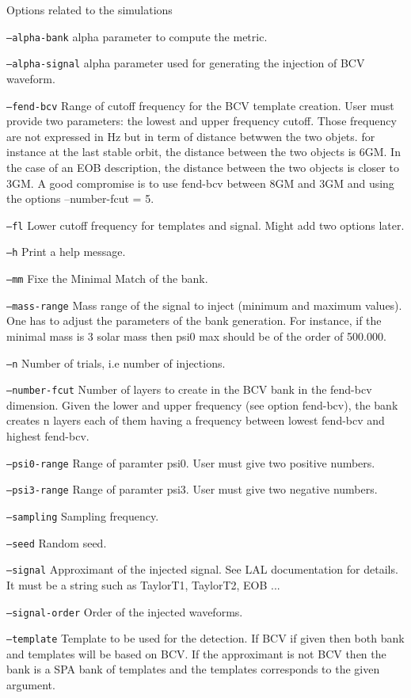 \begin{entry}
\item[Options related to the simulations]\leavevmode
\begin{entry}
\item[\texttt{--alpha-bank}]
alpha parameter to compute the metric.
\item[\texttt{--alpha-signal}]
alpha parameter used for generating the  injection of BCV waveform.
\item[\texttt{--fend-bcv}]
Range of cutoff frequency for the BCV template creation. User must provide two parameters: 
the lowest and upper frequency cutoff. Those frequency are not expressed in Hz but in term
of distance betwwen the two objets. for instance at the last stable orbit, the distance 
between the two objects is 6GM. In the case of an EOB description, the distance between 
the two objects is closer to 3GM. A good compromise is to use fend-bcv between 8GM and 3GM
and using the options --number-fcut = 5. 
\item[\texttt{--fl}]
Lower cutoff frequency for templates and signal. Might add two options later. 
\item[\texttt{--h}]
Print a help message.
\item[\texttt{--mm}]
Fixe the Minimal Match of the bank.
\item[\texttt{--mass-range}]
Mass range of the signal to inject (minimum and maximum values). One has to adjust
 the parameters of the bank generation. For instance, if the minimal mass is 3 solar
mass then psi0 max should be of the order of 500.000.
\item[\texttt{--n}]
Number of trials, i.e number of injections.
\item[\texttt{--number-fcut}]
Number of layers to create in the BCV bank in the fend-bcv dimension. 
Given the lower and upper frequency (see option fend-bcv), the bank creates
n layers each of them having a frequency between lowest fend-bcv and highest fend-bcv.
\item[\texttt{--psi0-range}]
Range of paramter psi0. User must give two positive numbers.
\item[\texttt{--psi3-range}]
Range of paramter psi3. User must give two negative numbers.
\item[\texttt{--sampling}]
Sampling frequency.
\item[\texttt{--seed}]
Random seed.
\item[\texttt{--signal}]
Approximant of the injected signal. See LAL documentation for details. It must be a string
such as TaylorT1, TaylorT2, EOB ...
\item[\texttt{--signal-order}]
Order of the injected waveforms.
\item[\texttt{--template}]
Template to be used for the detection. If BCV if given then both bank and templates will be
based on BCV. If the approximant is not BCV then the bank is a SPA bank of templates and the 
templates corresponds to the given argument.
\end{entry}





\end{entry}

